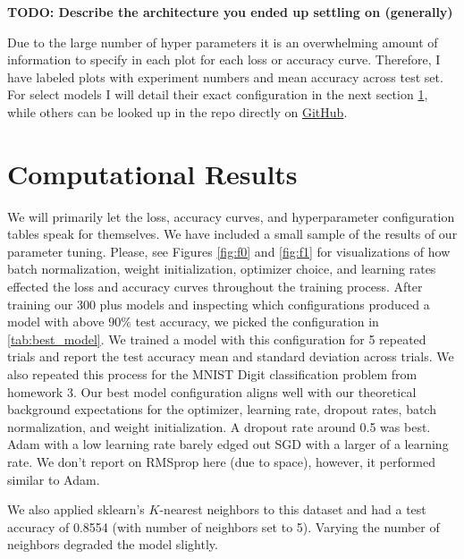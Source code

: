 \documentclass[11pt]{amsart}
\begin{document}
\textbf{TODO: Describe the architecture you ended up settling on (generally)}

Due to the large number of hyper parameters it is an overwhelming amount of information to specify in each plot for each loss or accuracy curve.
Therefore, I have labeled plots with experiment numbers and mean accuracy across test set.
For select models I will detail their exact configuration in the next section \ref{sec:results}, while others can be looked up in the repo directly on \href{https://github.com/hunter-lybbert/uw-central/blob/main/data_analysis/hw_05/experiments/experiments.json}{GitHub}.

\section{Computational Results}\label{sec:results}
We will primarily let the loss, accuracy curves, and hyperparameter configuration tables speak for themselves.
We have included a small sample of the results of our parameter tuning.
Please, see Figures \ref{fig:f0} and \ref{fig:f1} for visualizations of how batch normalization, weight initialization, optimizer choice, and learning rates effected the loss and accuracy curves throughout the training process.
After training our 300 plus models and inspecting which configurations produced a model with above $90\%$ test accuracy, we picked the configuration in \ref{tab:best_model}. We trained a model with this configuration for 5 repeated trials and report the test accuracy mean and standard deviation across trials.
We also repeated this process for the MNIST Digit classification problem from homework 3.
Our best model configuration aligns well with our theoretical background expectations for the optimizer, learning rate, dropout rates, batch normalization, and weight initialization.
A dropout rate around 0.5 was best.
Adam with a low learning rate barely edged out SGD with a larger of a learning rate.
We don't report on RMSprop here (due to space), however, it performed similar to Adam.

We also applied sklearn's $K$-nearest neighbors to this dataset and had a test accuracy of 0.8554 (with number of neighbors set to 5).
Varying the number of neighbors degraded the model slightly.
\end{document}
